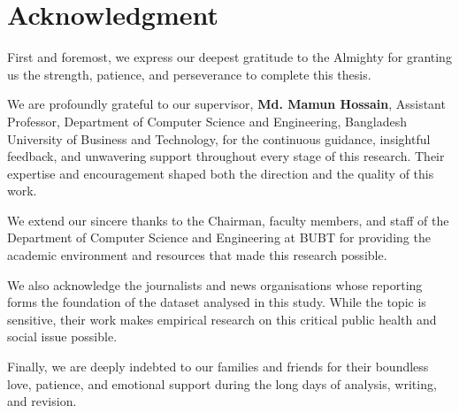 \chapter*{Acknowledgment}

\noindent First and foremost, we express our deepest gratitude to the Almighty for granting
us the strength, patience, and perseverance to complete this thesis.

\noindent We are profoundly grateful to our supervisor, \textbf{Md. Mamun Hossain},
Assistant Professor, Department of Computer Science and Engineering, Bangladesh University of
Business and Technology, for the continuous guidance, insightful feedback, and unwavering
support throughout every stage of this research. Their expertise and encouragement
shaped both the direction and the quality of this work.

\noindent We extend our sincere thanks to the Chairman, faculty members, and staff of the
Department of Computer Science and Engineering at BUBT for providing the academic
environment and resources that made this research possible.

\noindent We also acknowledge the journalists and news organisations whose reporting
forms the foundation of the dataset analysed in this study. While the topic is
sensitive, their work makes empirical research on this critical public health and
social issue possible.

\noindent Finally, we are deeply indebted to our families and friends for their
boundless love, patience, and emotional support during the long days of analysis,
writing, and revision.

\clearpage
